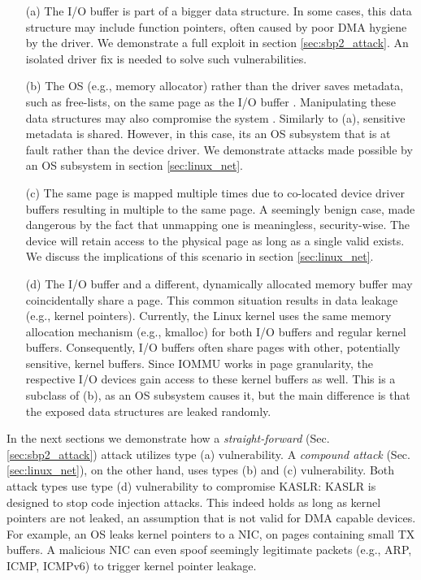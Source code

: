 \begin{enumerate}
    \item[(a)] The I/O buffer is part of a bigger data structure. In some cases, this data structure may include function pointers, often caused by poor DMA hygiene by the driver. We demonstrate a full exploit in section \ref{sec:sbp2_attack}. An isolated driver fix is needed to solve such vulnerabilities.
    \item[(b)] The OS (e.g., memory allocator) rather than the driver saves metadata, such as free-lists, on the same page as the I/O buffer \cite{Cor07}. Manipulating these data structures may also compromise the system \cite{ak09}. Similarly to (a), sensitive metadata is shared. However, in this case, its an OS subsystem that is at fault rather than the device driver. We demonstrate attacks made possible by an OS subsystem in section \ref{sec:linux_net}.
    \item[(c)] The same page is mapped multiple times due to co-located device driver buffers resulting in multiple \iova{} to the same page. A seemingly benign case, made dangerous by the fact that unmapping one \iova{} is meaningless, security-wise. The device will retain access to the physical page as long as a single valid \iova{} exists. We discuss the implications of this scenario in section \ref{sec:linux_net}.
    \item[(d)] The I/O buffer and a different, dynamically allocated memory buffer may coincidentally share a page. This common situation results in data leakage (e.g., kernel pointers). Currently, the Linux kernel uses the same memory allocation mechanism (e.g., kmalloc) for both I/O buffers and regular kernel buffers. Consequently, I/O buffers often share pages with other, potentially sensitive, kernel buffers. Since IOMMU works in page granularity, the respective I/O devices gain access to these kernel buffers as well. This is a subclass of (b), as an OS subsystem causes it, but the main difference is that the exposed data structures are leaked randomly.

\end{enumerate}

In the next sections we demonstrate how a \emph{straight-forward} (Sec. \ref{sec:sbp2_attack}) attack utilizes type (a) vulnerability. A \emph{compound attack} (Sec. \ref{sec:linux_net}), on the other hand, uses types (b) and (c) vulnerability. Both attack types use type (d) vulnerability to compromise KASLR: KASLR is designed to stop code injection attacks. This indeed holds as long as kernel pointers are not leaked, an assumption that is not valid for DMA capable devices. For example, an OS leaks kernel pointers to a NIC, on pages containing small TX buffers. A malicious NIC can even spoof seemingly legitimate packets (e.g., ARP, ICMP, ICMPv6) to trigger kernel pointer leakage.

